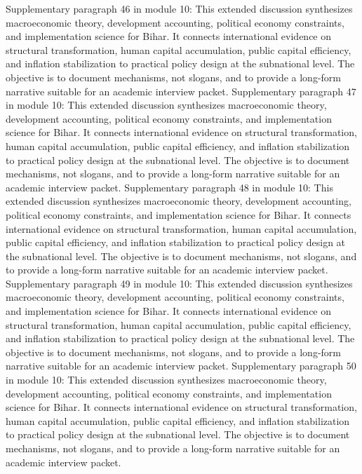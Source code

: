 \documentclass[preprint,12pt]{elsarticle}
\begin{document}
Supplementary paragraph 46 in module 10: This extended discussion synthesizes macroeconomic theory, development accounting, political economy constraints, and implementation science for Bihar. It connects international evidence on structural transformation, human capital accumulation, public capital efficiency, and inflation stabilization to practical policy design at the subnational level. The objective is to document mechanisms, not slogans, and to provide a long-form narrative suitable for an academic interview packet.
Supplementary paragraph 47 in module 10: This extended discussion synthesizes macroeconomic theory, development accounting, political economy constraints, and implementation science for Bihar. It connects international evidence on structural transformation, human capital accumulation, public capital efficiency, and inflation stabilization to practical policy design at the subnational level. The objective is to document mechanisms, not slogans, and to provide a long-form narrative suitable for an academic interview packet.
Supplementary paragraph 48 in module 10: This extended discussion synthesizes macroeconomic theory, development accounting, political economy constraints, and implementation science for Bihar. It connects international evidence on structural transformation, human capital accumulation, public capital efficiency, and inflation stabilization to practical policy design at the subnational level. The objective is to document mechanisms, not slogans, and to provide a long-form narrative suitable for an academic interview packet.
Supplementary paragraph 49 in module 10: This extended discussion synthesizes macroeconomic theory, development accounting, political economy constraints, and implementation science for Bihar. It connects international evidence on structural transformation, human capital accumulation, public capital efficiency, and inflation stabilization to practical policy design at the subnational level. The objective is to document mechanisms, not slogans, and to provide a long-form narrative suitable for an academic interview packet.
Supplementary paragraph 50 in module 10: This extended discussion synthesizes macroeconomic theory, development accounting, political economy constraints, and implementation science for Bihar. It connects international evidence on structural transformation, human capital accumulation, public capital efficiency, and inflation stabilization to practical policy design at the subnational level. The objective is to document mechanisms, not slogans, and to provide a long-form narrative suitable for an academic interview packet.
\end{document}
